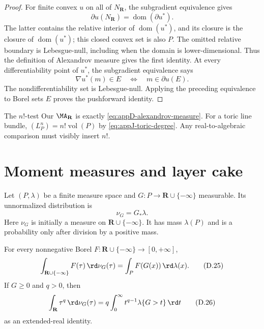 \begin{proof}
For finite convex \(u\) on all of \(N_{\mathbf R}\), the subgradient
equivalence gives
\[
 \partial u(N_{\mathbf R})=\operatorname{dom}(\partial u^*).
\]
The latter contains the relative interior of \(\operatorname{dom}(u^*)\),
and its closure is the closure of \(\operatorname{dom}(u^*)\); this closed
convex set is also \(P\).
The omitted relative boundary is Lebesgue-null, including when the domain is
lower-dimensional.  Thus the definition of Alexandrov measure gives the
first identity.  At every differentiability point of \(u^*\), the
subgradient equivalence says
\[
 \nabla u^*(m)\in E\quad\Longleftrightarrow\quad m\in\partial u(E).
\]
The nondifferentiability set is Lebesgue-null.  Applying the preceding
equivalence to Borel sets \(E\) proves the pushforward identity.
\end{proof}

\begin{warning}{The \(n!\)-test}
\label{warn:appD-factorial-normalization}
Our \(\MA_{\mathbf R}\) is exactly
\eqref{eq:appD-alexandrov-measure}.
For a toric line bundle,
\((L_P^n)=n!\operatorname{vol}(P)\) by
\eqref{eq:appJ-toric-degree}.
Any real-to-algebraic comparison must visibly insert \(n!\).
\end{warning}

\section{Moment measures and layer cake}
\label{sec:appD-moments}

Let \((P,\lambda)\) be a finite measure space and
\(G:P\to\mathbf R\cup\{-\infty\}\) measurable.
Its unnormalized distribution is
\[
                             \nu_G=G_*\lambda.
\tag{D.24}\label{eq:appD-pushforward-distribution}
\]
Here \(\nu_G\) is initially a measure on
\(\mathbf R\cup\{-\infty\}\).
It has mass \(\lambda(P)\) and is a probability only after division by a
positive mass.

\begin{proposition}\label{prop:appD-moment-tail}
For every nonnegative Borel
\(F:\mathbf R\cup\{-\infty\}\to[0,+\infty]\),
\[
 \int_{\mathbf R\cup\{-\infty\}}F(\tau)\,\rd \nu_G(\tau)
 =\int_PF(G(x))\,\rd \lambda(x).
\tag{D.25}\label{eq:appD-pushforward-test}
\]
If \(G\geq0\) and \(q>0\), then
\[
 \int_{\mathbf R}\tau^q\,\rd \nu_G(\tau)
 =
 q\int_0^\infty
 t^{q-1}\lambda\{G>t\}\,\rd t
\tag{D.26}\label{eq:appD-layer-cake}
\]
as an extended-real identity.
\end{proposition}

